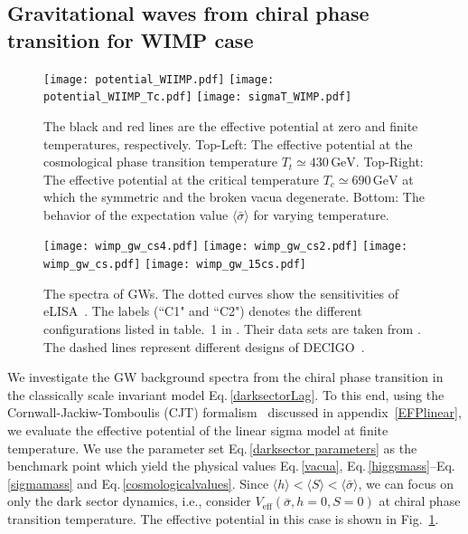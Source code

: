 \documentclass[a4paper,preprint,superscriptaddress,preprintnumbers,nofootinbib]{revtex4}
\newcommand{\fn}[1]{\!\left(#1\right)}
\newcommand{\bra}{\langle}
\newcommand{\ket}{\rangle}
\begin{document}
\subsection{Gravitational waves from chiral phase transition for WIMP case}
\begin{figure}
\begin{center}
\texttt{[image: potential\_WIIMP.pdf]}
\texttt{[image: potential\_WIIMP\_Tc.pdf]}
\texttt{[image: sigmaT\_WIMP.pdf]}
\end{center}
\caption{The black and red lines are the effective potential at zero and finite temperatures, respectively.
Top-Left: The effective potential at the cosmological phase transition temperature $T_t\simeq 430\,\text{GeV}$. Top-Right: The effective potential at the critical temperature $T_c\simeq 690\,\text{GeV}$ at which the symmetric and the broken vacua degenerate.
Bottom: The behavior of the expectation value $\bra \bar \sigma \ket$ for varying temperature.
}
\label{potentials}
\end{figure}
\begin{figure}
\begin{center}
\texttt{[image: wimp\_gw\_cs4.pdf]}
\texttt{[image: wimp\_gw\_cs2.pdf]}
\texttt{[image: wimp\_gw\_cs.pdf]}
\texttt{[image: wimp\_gw\_15cs.pdf]}
\caption{The spectra of GWs. The dotted curves show the sensitivities of eLISA~\cite{Seoane:2013qna,Audley:2017drz}. The labels (``C1" and ``C2") denotes the different configurations listed in table.~1 in \cite{Caprini:2015zlo}. Their data sets are taken from \cite{eLisadetasets}.
The dashed lines represent different designs of DECIGO~\cite{Seto:2001qf,Kawamura:2006up,Kawamura:2011zz}.
}
\label{wimpgw}
\end{center}
\end{figure}
We investigate the GW background spectra from the chiral phase transition in the classically scale invariant model Eq.\,\eqref{darksectorLag}.
To this end, using the Cornwall-Jackiw-Tomboulis (CJT) formalism~\cite{Cornwall:1974vz} discussed in appendix~\ref{EFPlinear}, we evaluate the effective potential of the linear sigma model at finite temperature.
We use the parameter set Eq.\,\eqref{darksector parameters} as the benchmark point which yield the physical values Eq.\,\eqref{vacua}, Eq.\,\eqref{higgsmass}--Eq.\,\eqref{sigmamass} and Eq.\,\eqref{cosmologicalvalues}.
Since $\bra h \ket < \bra S\ket < \bra \bar \sigma \ket$, we can focus on only the dark sector dynamics, i.e., consider $V_\text{eff}\fn{\bar \sigma,h=0,S=0}$ at chiral phase transition temperature.
The effective potential in this case is shown in Fig.~\ref{potentials}.
\end{document}
